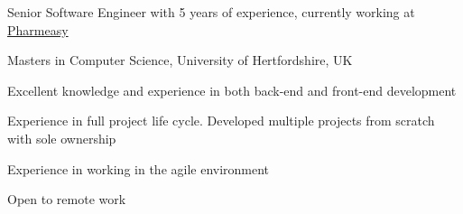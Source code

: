 
\begin{cventries}

    \cventry
    {} %
    {} %
    {} %
    {} %
    {
        \begin{cvitems} %
            \item {Senior Software Engineer with 5 years of experience, currently working at \href{https://www.pharmeasy.in}{Pharmeasy\acvHeaderIconSep\faExternalLink}}
            \item {Masters in Computer Science, University of Hertfordshire, UK}
            \item {Excellent knowledge and experience in both back-end and front-end development}
            \item {Experience in full project life cycle.
            Developed multiple projects from scratch with sole ownership}
            \item {Experience in working in the agile environment}
            \item {Open to remote work}
        \end{cvitems}
    }
\end{cventries}